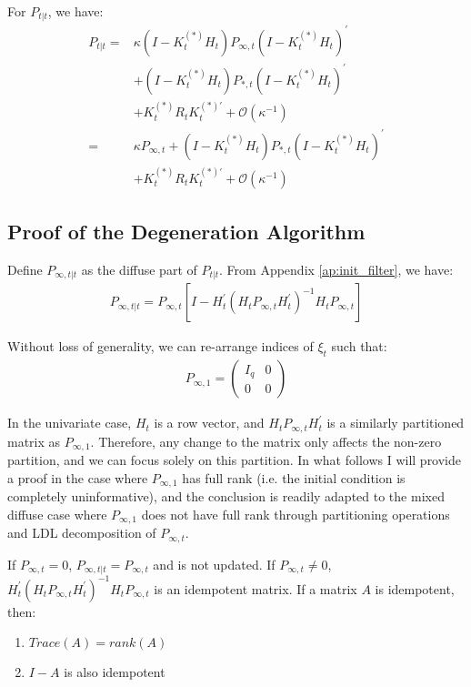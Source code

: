 \documentclass[10pt, titlepage]{article}
\newenvironment{boenumerate}
    {\begin{enumerate}\renewcommand\labelenumi{\textbf\theenumi}}
    {\end{enumerate}}
\numberwithin{equation}{section}
\begin{document}
For $P_{t|t}$, we have:
\begin{align}
    P_{t|t} =& \kappa (I-K_t^{(*)}H_t)P_{\infty,t}(I-K_t^{(*)}H_t)^{'} \nonumber \\
    &+ (I-K_t^{(*)}H_t)P_{*,t}(I-K_t^{(*)}H_t)^{'} \nonumber \\
    &+ K_t^{(*)}R_tK_t^{(*)'} + \mathcal{O}(\kappa^{-1}) \nonumber \\
    =& \kappa P_{\infty, t} + (I-K_t^{(*)}H_t)P_{*,t}(I-K_t^{(*)}H_t)^{'} \label{eq:diff_P2} \\
    &+ K_t^{(*)}R_tK_t^{(*)'} + \mathcal{O}(\kappa^{-1}) \nonumber
\end{align}

\subsection{Proof of the Degeneration Algorithm} \label{ap:transition}
Define $P_{\infty,t|t}$ as the diffuse part of $P_{t|t}$. From Appendix \ref{ap:init_filter}, we have:
\begin{align*}
    P_{\infty,t|t} = P_{\infty,t}[I - H_t^{'}(H_tP_{\infty,t}H_t^{'})^{-1}H_tP_{\infty,t}]
\end{align*}

Without loss of generality, we can re-arrange indices of $\xi_t$ such that:
\begin{align*}
    P_{\infty,1}=\begin{pmatrix}
        I_q & 0 \\
        0 & 0
    \end{pmatrix}
\end{align*}

In the univariate case, $H_t$ is a row vector, and $H_tP_{\infty,t}H_t^{'}$ is a similarly partitioned matrix as $P_{\infty, 1}$. Therefore, any change to the matrix only affects the non-zero partition, and we can focus solely on this partition. In what follows I will provide a proof in the case where $P_{\infty,1}$ has full rank (i.e. the initial condition is completely uninformative), and the conclusion is readily adapted to the mixed diffuse case where $P_{\infty,1}$ does not have full rank through partitioning operations and LDL decomposition of $P_{\infty,t}$. 

If $P_{\infty,t}=0$, $P_{\infty,t|t} = P_{\infty,t}$ and is not updated. If $P_{\infty,t}\neq0$, $H_t^{'}(H_tP_{\infty,t}H_t^{'})^{-1}H_tP_{\infty,t}$ is an idempotent matrix. If a matrix $A$ is idempotent, then:
\begin{boenumerate}
    \item $Trace(A)=rank(A)$
    \item $I-A$ is also idempotent
\end{boenumerate}
\end{document}
